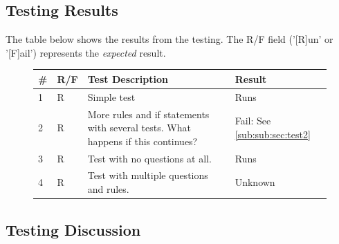\documentclass[12pt]{report}
\begin{document}
\subsection{Testing Results}\label{sub:sec:testing_results}
The table below shows the results from the testing.  The R/F field ('[R]un' or '[F]ail') represents the \textit{expected} result.
\begin{figure}[H]
	\begin{tabular}{| l | l | p{270pt} | p{130pt} |}
		\hline
		\textbf{\#} & \textbf{R/F} & \textbf{Test Description} & \textbf{Result} \\ \hline
		1 & R & Simple test & Runs \\ \hline
		2 & R & More rules and if statements with several tests. What happens if this continues? & Fail: See \ref{sub:sub:sec:test2} \\ \hline
		3 & R & Test with no questions at all. & Runs \\ \hline
		4 & R & Test with multiple questions and rules. & Unknown \\ \hline
	\end{tabular}
\end{figure}
\subsection{Testing Discussion}\label{sub:sec:testing_discussion}
\end{document}
